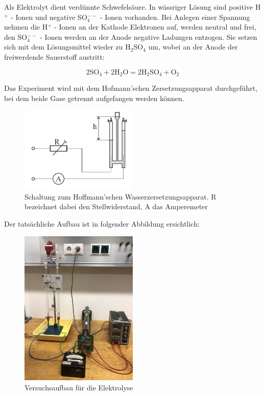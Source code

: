 \documentclass[11pt,ngerman]{scrartcl}
\begin{document}
Als Elektrolyt dient verdünnte Schwefelsäure. In wässriger Lösung sind positive H$^+$ - Ionen und negative SO$^{--}_4$ - Ionen vorhanden. Bei Anlegen einer Spannung nehmen die H$^+$ - Ionen an der
Kathode Elektronen auf, werden neutral und frei, den SO$^{--}_4$ - Ionen werden an der Anode negative
Ladungen entzogen. Sie setzen sich mit dem Lösungsmittel wieder zu H$_2$SO$_4$ um, wobei an der
Anode der freiwerdende Sauerstoff austritt:

\begin{equation}
	2\textrm{SO}_4 + 2\textrm{H}_2\textrm{O} = 2\textrm{H}_2\textrm{SO}_4 + \textrm{O}_2
\end{equation}

Das Experiment wird mit dem Hofmann'schen Zersetzungsapparat durchgeführt, bei dem beide
Gase getrennt aufgefangen werden können.

\begin{figure}[H]
	\begin{center}
		\includegraphics[width=0.5\textwidth]{abb3}
	\end{center}
	\caption{Schaltung zum Hoffmann'schen Wasserzersetzungsapparat. R bezeichnet dabei den Stellwiderstand,
		A das Amperemeter}
	\label{fig:abb3}
\end{figure}

Der tatsächliche Aufbau ist in folgender Abbildung ersichtlich:

\begin{figure}[H]
	\begin{center}
		\includegraphics[angle=-90,width=0.5\textwidth]{aufbau_el}
	\end{center}
	\caption{Versuchsaufbau für die Elektrolyse}
	\label{fig:aufbau_el}
\end{figure}\cite{vorlagesilber}
\end{document}

